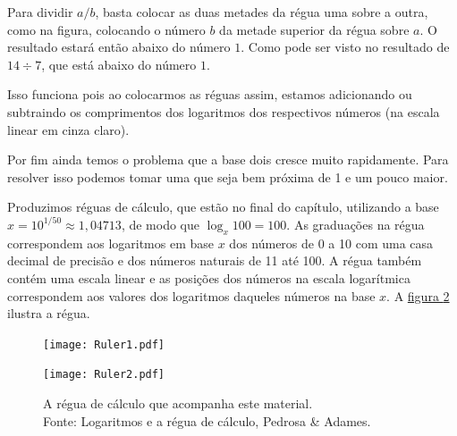 \begin{figure}[H]

\label{Reguas}
\end{figure}


Para dividir $a / b$, basta colocar as duas metades da régua uma sobre a outra, como na figura, colocando o número $b$ da metade 
superior da régua sobre $a$. O resultado estará então abaixo do número $1$. Como pode ser visto no resultado de $14 \div 7$, que está abaixo do número $1$.

Isso funciona pois ao colocarmos as réguas assim, estamos adicionando ou  subtraindo os comprimentos dos logaritmos dos respectivos números (na escala linear em cinza claro).

Por fim ainda temos o problema que a base dois cresce muito rapidamente. Para resolver isso podemos tomar uma que seja bem próxima de 1 e um pouco maior.

Produzimos réguas de cálculo, que estão no final do capítulo, utilizando a base $x = 10^{1/50}\approx 1{,}04713$, de modo que $\log_{x}100=100$. As graduações na régua correspondem aos logaritmos em base $x$ dos números de 0 a 10 com uma casa decimal de precisão e dos números naturais de 11 até 100. A régua também contém uma escala linear e as posições dos números na escala logarítmica correspondem aos valores dos logaritmos daqueles números na base $x$. A \hyperref[ReguaCalculo]{figura \ref{ReguaCalculo}} ilustra a régua.

\begin{figure}[H]
\texttt{[image: Ruler1.pdf]}

\texttt{[image: Ruler2.pdf]}

\caption{A régua de cálculo que acompanha este material. \\ Fonte: Logaritmos e a régua de cálculo, Pedrosa \& Adames.}\label{ReguaCalculo}
\end{figure}


